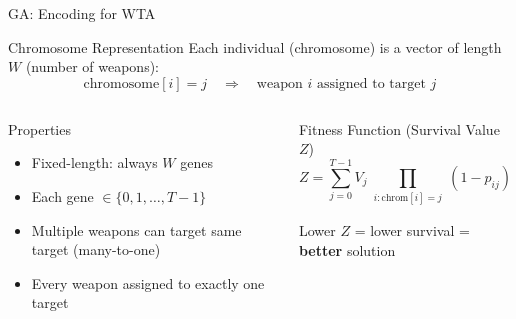 \documentclass[aspectratio=43,8pt]{beamer}
\begin{document}
\begin{frame}[fragile]{GA: Encoding for WTA}
\begin{block}{Chromosome Representation}
Each individual (chromosome) is a vector of length $W$ (number of weapons):
$$\text{chromosome}[i] = j \quad \Rightarrow \quad \text{weapon } i \text{ assigned to target } j$$
\end{block}

\vspace{0.3cm}
\begin{center}
\end{center}

\vspace{0.3cm}
\begin{columns}[t]
\begin{exampleblock}{Properties}
\begin{itemize}
    \item Fixed-length: always $W$ genes
    \item Each gene $\in \{0, 1, \ldots, T-1\}$
    \item Multiple weapons can target same target (many-to-one)
    \item Every weapon assigned to exactly one target
\end{itemize}
\end{exampleblock}

\begin{alertblock}{Fitness Function (Survival Value $Z$)}
$$Z = \sum_{j=0}^{T-1} V_j \prod_{\substack{i: \text{chrom}[i]=j}} (1 - p_{ij})$$

Lower $Z$ = lower survival = \textbf{better} solution
\end{alertblock}
\end{columns}
\end{frame}
\end{document}
